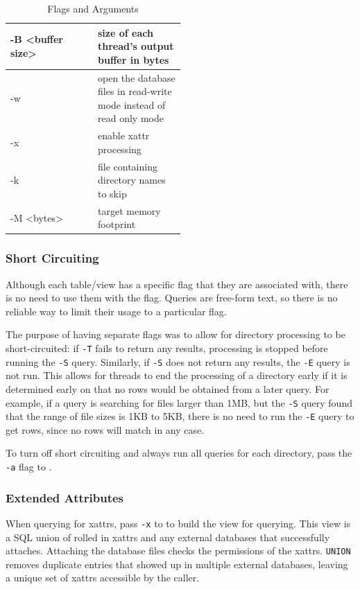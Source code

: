 \begin{table} [H]
\begin{tabular*}{\linewidth}{l|p{0.5\linewidth}}
    \hline
    -B \textless buffer size\textgreater & size of each thread's output buffer in bytes \\
    \hline
    -w & open the database files in read-write mode instead of read only mode \\
    \hline
    -x & enable xattr processing \\
    \hline
    -k & file containing directory names to skip \\
    \hline
    -M \textless bytes\textgreater & target memory footprint \\
    \hline
  \end{tabular*}
  \caption{\label{tab:widgets} \gufiquery Flags and Arguments}
\end{table}

\subsubsection{Short Circuiting}
Although each table/view has a specific flag that they are associated
with, there is no need to use them with the flag. Queries are
free-form text, so there is no reliable way to limit their usage to a
particular flag.

The purpose of having separate flags was to allow for directory
processing to be short-circuited: if \texttt{-T} fails to return any
results, processing is stopped before running the \texttt{-S}
query. Similarly, if \texttt{-S} does not return any results, the
\texttt{-E} query is not run. This allows for threads to end the
processing of a directory early if it is determined early on that no
rows would be obtained from a later query. For example, if a query is
searching for files larger than 1MB, but the \texttt{-S} query found
that the range of file sizes is 1KB to 5KB, there is no need to run
the \texttt{-E} query to get rows, since no rows will match in any
case.

To turn off short circuiting and always run all queries for each
directory, pass the \texttt{-a} flag to \gufiquery.

\subsubsection{Extended Attributes}
When querying for xattrs, pass \texttt{-x} to \gufiquery to build the
\xattrs view for querying. This view is a SQL union of rolled in
xattrs and any external databases that successfully
attaches. Attaching the database files checks the permissions of the
xattrs. \texttt{UNION} removes duplicate entries that showed up in
multiple external databases, leaving a unique set of xattrs accessible
by the caller.

